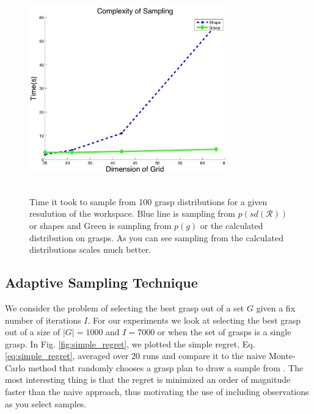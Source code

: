 \documentclass[letterpaper, 10 pt, conference]{ieeeconf}  %
\begin{document}
\begin{figure}[ht!]
\centering
\includegraphics[width=8.5cm,height=9cm]{figures/Slide12.jpg}
\caption{ \footnotesize Time it took to sample from 100 grasp distributions for a given resulution of the workspace. Blue line is sampling from $p(sd(\mathcal{R}))$ or shapes and Green is sampling from $p(g)$ or the calculated distribution on grasps. As you can see sampling from the calculated distributions scales much better. }
\vspace*{-10pt}
\label{fig:speed_dif}
\end{figure}





\subsection{Adaptive Sampling Technique}

We consider the problem of selecting the best grasp out of a set $G$ given a fix number of iterations $I$. For our experiments we look at selecting the best grasp out of a size of $|G| = 1000$ and $I= 7000$ or when the set of grasps is a single grasp. In Fig. \ref{fig:simple_regret}, we plotted the simple regret, Eq. \ref{eq:simple_regret}, averaged over 20 runs and compare it to the naive Monte-Carlo method that randomly chooses a grasp plan to draw a sample from . The most interesting thing is that the regret is minimized an order of magnitude faster than the naive approach, thus motivating the use of including observations as you select samples. 
\end{document}
